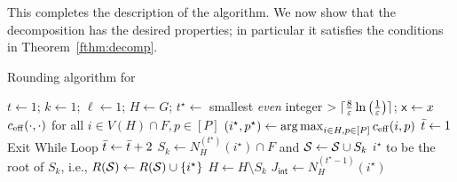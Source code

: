 This completes the description of the algorithm. We now show that the decomposition has the desired properties; in particular it satisfies the conditions in Theorem~\ref{fthm:decomp}.

\begin{algorithm}
\caption{Rounding algorithm for~}\label{falground}
\begin{algorithmic}[1]
\State $t \gets 1$; $k \gets 1$; $\ell \gets 1$; $H  \gets G$; $t^\star \gets$ smallest {\em even} integer $> \lceil\frac{8}{\varepsilon}\ln\left(\frac{1}{\varepsilon}\right)\rceil$; ${\mathsf x} \gets x$
 \label{falg:iter}
 $c_{\mathrm{eff}}(\cdot,\cdot)$ for all $i \in V(H) \cap F, p \in [P]$
\State $(i^\star,p^\star) \gets \operatorname*{arg\,max}_{i \in H, p \in [P]} c_{\mathrm{eff}}(i,p)$  \label{falg:istar}
\State $\bar{t} \gets 1$ 
\State Exit While Loop
\Else
\State $\bar{t} \gets \bar{t}+2$
\EndIf
\EndWhile
 
\State $S_k \gets N^{(t^\star)}_H(i^\star)\cap F$ and ${\cal S} \gets {\cal S} \cup S_k$ \label{falg:case1}
 $i^\star$ to be the root of $S_k$, i.e., $R({\cal S}) \gets R({\cal S}) \cup \{i^\star\}$
\State $H \gets H \setminus S_k$ 
\State $J_\mathsf{int}\gets  N^{(t^\star-1)}_H(i^\star)$ 
 

\end{algorithmic}
\end{algorithm}

